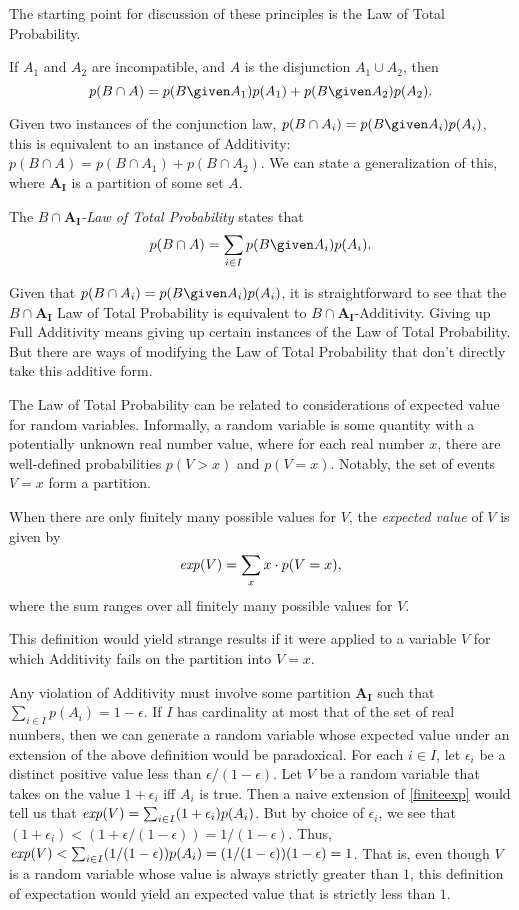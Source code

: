 The starting point for discussion of these principles is the Law of Total Probability.
\begin{theorem}
If $A_1$ and $A_2$ are incompatible, and $A$ is the disjunction $A_1\cup A_2$, then
$$p(B\cap A)=p(B \given A_1)p(A_1)+p(B \given A_2)p(A_2).$$
\end{theorem}
Given two instances of the conjunction law, $p(B\cap A_i)=p(B \given A_i)p(A_i)$, this is equivalent to an instance of Additivity: $p(B\cap A)=p(B\cap A_1)+p(B\cap A_2)$. We can state a generalization of this, where $\mathbf{A_I}$ is a partition of some set $A$.
\begin{definition}
The \emph{$B\cap\mathbf{A_I}$-Law of Total Probability} states that
$$p(B\cap A)=\sum_{i\in I}p(B \given A_i)p(A_i).$$
\end{definition}
Given that $p(B\cap A_i)=p(B \given A_i)p(A_i)$, it is straightforward to see that the $B\cap\mathbf{A_I}$ Law of Total Probability is equivalent to $B\cap\mathbf{A_I}$-Additivity. Giving up Full Additivity means giving up certain instances of the Law of Total Probability. But there are ways of modifying the Law of Total Probability that don't directly take this additive form.

The Law of Total Probability can be related to considerations of expected value for random variables. Informally, a random variable is some quantity with a potentially unknown real number value, where for each real number $x$, there are well-defined probabilities $p(V>x)$ and $p(V=x)$. Notably, the set of events $V=x$ form a partition.
\begin{definition}\label{finiteexp}
When there are only finitely many possible values for $V$, the \emph{expected value} of $V$ is given by
$$\text{\textit{exp}}(V)=\sum_x x\cdot p(V=x),$$ where the sum ranges over all finitely many possible values for $V$.\end{definition}
This definition would yield strange results if it were applied to a variable $V$ for which Additivity fails on the partition into $V=x$.

Any violation of Additivity must involve some partition $\mathbf{A_I}$ such that $\sum_{i\in I}p(A_i)=1-\epsilon$. If $I$ has cardinality at most that of the set of real numbers, then we can generate a random variable whose expected value under an extension of the above definition would be paradoxical. For each $i\in I$, let $\epsilon_i$ be a distinct positive value less than $\epsilon/(1-\epsilon)$. Let $V$ be a random variable that takes on the value $1+\epsilon_i$ iff $A_i$ is true. Then a naive extension of  \autoref{finiteexp} would tell us that $\text{\textit{exp}}(V)=\sum_{i\in I}(1+\epsilon_i)p(A_i)$. But by choice of $\epsilon_i$, we see that $(1+\epsilon_i)<(1+\epsilon/(1-\epsilon))=1/(1-\epsilon)$. Thus, $\text{\textit{exp}}(V)<\sum_{i\in I}(1/(1-\epsilon))p(A_i)=(1/(1-\epsilon))(1-\epsilon)=1$. That is, even though $V$ is a random variable whose value is always strictly greater than $1$, this definition of expectation would yield an expected value that is strictly less than $1$.


